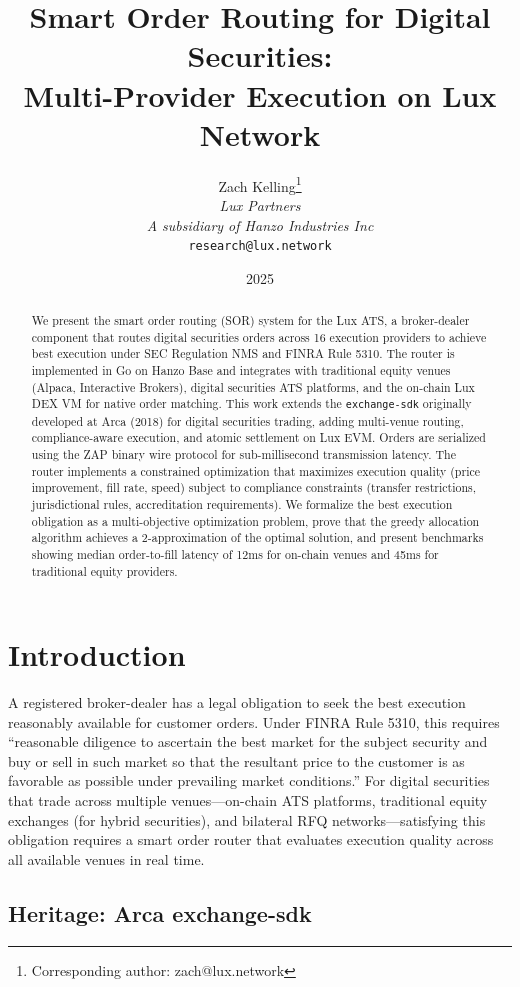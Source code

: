 \documentclass[11pt,a4paper]{article}
\title{Smart Order Routing for Digital Securities:\\Multi-Provider Execution on Lux Network}
\author{
Zach Kelling\thanks{Corresponding author: zach@lux.network}\\
\textit{Lux Partners}\\
\textit{A subsidiary of Hanzo Industries Inc}\\
\texttt{research@lux.network}
}
\date{2025}
\begin{document}
\luxcoverpage

\begin{abstract}
We present the smart order routing (SOR) system for the Lux ATS, a broker-dealer component that routes digital securities orders across 16 execution providers to achieve best execution under SEC Regulation NMS and FINRA Rule 5310. The router is implemented in Go on Hanzo Base and integrates with traditional equity venues (Alpaca, Interactive Brokers), digital securities ATS platforms, and the on-chain Lux DEX VM for native order matching. This work extends the \texttt{exchange-sdk} originally developed at Arca (2018) for digital securities trading, adding multi-venue routing, compliance-aware execution, and atomic settlement on Lux EVM. Orders are serialized using the ZAP binary wire protocol for sub-millisecond transmission latency. The router implements a constrained optimization that maximizes execution quality (price improvement, fill rate, speed) subject to compliance constraints (transfer restrictions, jurisdictional rules, accreditation requirements). We formalize the best execution obligation as a multi-objective optimization problem, prove that the greedy allocation algorithm achieves a 2-approximation of the optimal solution, and present benchmarks showing median order-to-fill latency of 12ms for on-chain venues and 45ms for traditional equity providers.
\end{abstract}

\section{Introduction}

A registered broker-dealer has a legal obligation to seek the best execution reasonably available for customer orders. Under FINRA Rule 5310, this requires ``reasonable diligence to ascertain the best market for the subject security and buy or sell in such market so that the resultant price to the customer is as favorable as possible under prevailing market conditions.'' For digital securities that trade across multiple venues---on-chain ATS platforms, traditional equity exchanges (for hybrid securities), and bilateral RFQ networks---satisfying this obligation requires a smart order router that evaluates execution quality across all available venues in real time.

\subsection{Heritage: Arca exchange-sdk}
\end{document}
